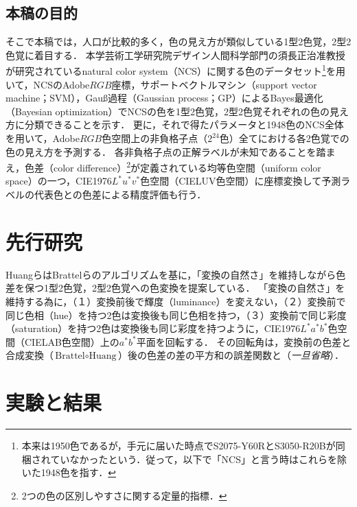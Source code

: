 \documentclass[uplatex,paper=a4,fontsize=4.0truemm,jafontsize=4.0truemm,head_space=30.0truemm,baselineskip=8.0truemm,gutter=25.0truemm,oneside,fleqn,hanging_panctuation,open_bracket_pos=nibu_tentsuki,dvipdfmx,jis2004,book,titlepage]{jlreq}
\theoremstyle{mystyle}
\newcommand{\mathdisplaystyle}[1]{\(\displaystyle{#1}\)}
\begin{document}
		\section{本稿の目的}
			そこで本稿では，人口が比較的多く，色の見え方が類似している1型2色覚，2型2色覚に着目する．
			本学芸術工学研究院デザイン人間科学部門の須長正治准教授が研究されているnatural color system（NCS）に関する色のデータセット\footnote{本来は1950色であるが，手元に届いた時点でS2075-Y60RとS3050-R20Bが同梱されていなかったという．従って，以下で「NCS」と言う時はこれらを除いた1948色を指す．}を用いて，NCSのAdobe\mathdisplaystyle{RGB}座標，サポートベクトルマシン（support vector machine；SVM），Gauß過程（Gaussian process；GP）によるBayes最適化（Bayesian optimization）でNCSの色を1型2色覚，2型2色覚それぞれの色の見え方に分類できることを示す．
			更に，それで得たパラメータと1948色のNCS全体を用いて，Adobe\mathdisplaystyle{RGB}色空間上の非負格子点（\mathdisplaystyle{2^{24}}色）全てにおける各2色覚での色の見え方を予測する．
			各非負格子点の正解ラベルが未知であることを踏まえ，色差（color difference）\footnote{2つの色の区別しやすさに関する定量的指標．}が定義されている均等色空間（uniform color space）の一つ，CIE1976\mathdisplaystyle{L^\ast u^\ast v^\ast}色空間（CIELUV色空間）\cite[p.~64]{Yaguchi2017b}に座標変換して予測ラベルの代表色との色差による精度評価も行う．
	\chapter{先行研究}
		HuangらはBrattelらのアルゴリズムを基に，「変換の自然さ」を維持しながら色差を保つ1型2色覚，2型2色覚への色変換を提案している\cite{Huang2007}．
		「変換の自然さ」を維持する為に，（１）変換前後で輝度（luminance）を変えない，（２）変換前で同じ色相（hue）を持つ2色は変換後も同じ色相を持つ，（３）変換前で同じ彩度（saturation）を持つ2色は変換後も同じ彩度を持つように，CIE1976\mathdisplaystyle{L^\ast a^\ast b^\ast}色空間（CIELAB色空間）上の\mathdisplaystyle{a^\ast b^\ast}平面を回転する．
		その回転角は，変換前の色差と合成変換（\mathdisplaystyle{\textrm{Brattel}\circ\textrm{Huang}}）後の色差の差の平方和の誤差関数と（\emph{一旦省略}）．
	\chapter{実験と結果}
\end{document}

